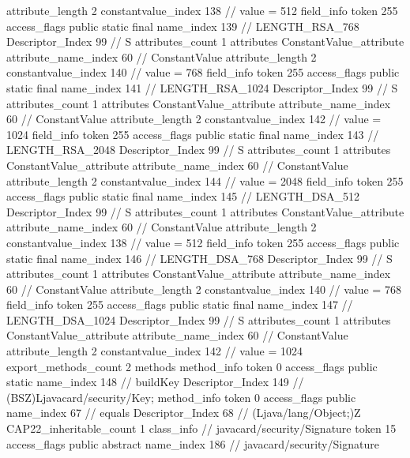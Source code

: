 {{{{{{{					attribute_length	2
					constantvalue_index	138		// value = 512
				}
				}
			}
			field_info {
				token	255
				access_flags	public static final
				name_index	139		// LENGTH_RSA_768
				Descriptor_Index	99		// S
				attributes_count	1
				attributes {
				ConstantValue_attribute {
					attribute_name_index	60		// ConstantValue
					attribute_length	2
					constantvalue_index	140		// value = 768
				}
				}
			}
			field_info {
				token	255
				access_flags	public static final
				name_index	141		// LENGTH_RSA_1024
				Descriptor_Index	99		// S
				attributes_count	1
				attributes {
				ConstantValue_attribute {
					attribute_name_index	60		// ConstantValue
					attribute_length	2
					constantvalue_index	142		// value = 1024
				}
				}
			}
			field_info {
				token	255
				access_flags	public static final
				name_index	143		// LENGTH_RSA_2048
				Descriptor_Index	99		// S
				attributes_count	1
				attributes {
				ConstantValue_attribute {
					attribute_name_index	60		// ConstantValue
					attribute_length	2
					constantvalue_index	144		// value = 2048
				}
				}
			}
			field_info {
				token	255
				access_flags	public static final
				name_index	145		// LENGTH_DSA_512
				Descriptor_Index	99		// S
				attributes_count	1
				attributes {
				ConstantValue_attribute {
					attribute_name_index	60		// ConstantValue
					attribute_length	2
					constantvalue_index	138		// value = 512
				}
				}
			}
			field_info {
				token	255
				access_flags	public static final
				name_index	146		// LENGTH_DSA_768
				Descriptor_Index	99		// S
				attributes_count	1
				attributes {
				ConstantValue_attribute {
					attribute_name_index	60		// ConstantValue
					attribute_length	2
					constantvalue_index	140		// value = 768
				}
				}
			}
			field_info {
				token	255
				access_flags	public static final
				name_index	147		// LENGTH_DSA_1024
				Descriptor_Index	99		// S
				attributes_count	1
				attributes {
				ConstantValue_attribute {
					attribute_name_index	60		// ConstantValue
					attribute_length	2
					constantvalue_index	142		// value = 1024
				}
				}
			}
			}
			export_methods_count	2
			methods {
				method_info {
					token	0
					access_flags	public static
					name_index	148		// buildKey
					Descriptor_Index	149		// (BSZ)Ljavacard/security/Key;
				}
				method_info {
					token	0
					access_flags	public
					name_index	67		// equals
					Descriptor_Index	68		// (Ljava/lang/Object;)Z
				}
			}
			CAP22_inheritable_count	1
		}
		class_info {		// javacard/security/Signature
			token	15
			access_flags	public abstract
			name_index	186		// javacard/security/Signature
}}}
